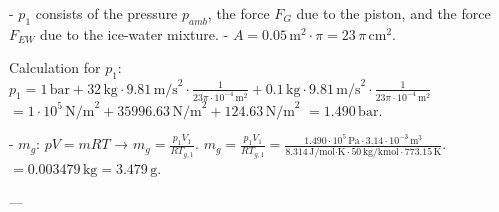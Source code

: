 - \( p_1 \) consists of the pressure \( p_{amb} \), the force \( F_G \) due to the piston, and the force \( F_{EW} \) due to the ice-water mixture.  
- \( A = 0.05 \, \text{m}^2 \cdot \pi = 23 \, \pi \, \text{cm}^2 \).  

Calculation for \( p_1 \):  
\( p_1 = 1 \, \text{bar} + 32 \, \text{kg} \cdot 9.81 \, \text{m/s}^2 \cdot \frac{1}{23 \pi \cdot 10^{-4} \, \text{m}^2} + 0.1 \, \text{kg} \cdot 9.81 \, \text{m/s}^2 \cdot \frac{1}{23 \pi \cdot 10^{-4} \, \text{m}^2} \)  
\( = 1 \cdot 10^5 \, \text{N/m}^2 + 35996.63 \, \text{N/m}^2 + 124.63 \, \text{N/m}^2 \)  
\( = 1.490 \, \text{bar} \).  

- \( m_g \): \( pV = mRT \) → \( m_g = \frac{p_1 V_1}{R T_{g,1}} \).  
\( m_g = \frac{p_1 V_1}{R T_{g,1}} = \frac{1.490 \cdot 10^5 \, \text{Pa} \cdot 3.14 \cdot 10^{-3} \, \text{m}^3}{8.314 \, \text{J/mol·K} \cdot 50 \, \text{kg/kmol} \cdot 773.15 \, \text{K}} \).  
\( = 0.003479 \, \text{kg} = 3.479 \, \text{g} \).  

---